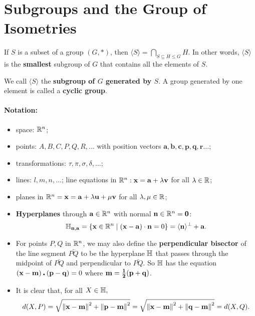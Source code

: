 \section{Subgroups and the Group of Isometries}

\begin{lemma}
    If \(S\) is a subset of a group \((G, *)\), then \(\langle S \rangle = \bigcap_{S \subseteq H \leq G} H\). In other words, \(\langle S \rangle\) is the \textbf{smallest} subgroup of \(G\) that contains all the elements of \(S\).
\end{lemma}

\begin{definition}
    We call \(\langle S \rangle\) the \textbf{subgroup of \(G\) generated by \(S\)}. A group generated by one element is called a \textbf{cyclic group}.
\end{definition}

\paragraph{Notation:}
\begin{itemize}
    \item space: \(\mathbb{R}^n\);
    \item points: \(A, B, C, P, Q, R, \dots\) with position vectors \(\mathbf{a, b, c, p , q, r} \dots\);
    \item transformations: \(\tau, \pi, \sigma, \delta, \dots\);
    \item lines: \(l, m, n, \dots\); line equations in \(\mathbb{R}^n: \mathbf{x} = \mathbf{a} + \lambda \mathbf{v}\) for all \(\lambda \in \mathbb{R}\);
    \item planes in \(\mathbb{R}^n = \mathbf{x} = \mathbf{a} + \lambda \mathbf{u} + \mu \mathbf{v}\) for all \(\lambda, \mu \in \mathbb{R}\);
    \item \textbf{Hyperplanes} through \(\mathbf{a} \in \mathbb{R}^n\) with normal \(\mathbf{n} \in \mathbb{R}^n = \mathbf{0}\):
          \[\mathbb{H}_{\mathbf{n, a}} = \{ \mathbf{x} \in \mathbb{R}^n \mid (\mathbf{x} - \mathbf{a}) \cdot \mathbf{n} = 0 \} = \langle \mathbf{n} \rangle^\perp + \mathbf{a}. \]
    \item For points \(P, Q\) in \(\mathbb{R}^n\), we may also define the \textbf{perpendicular bisector} of the line segment \(\bar{PQ}\) to be the hyperplane \(\mathbb{H}\) that passes through the midpoint of \(\bar{PQ}\) and perpendicular to \(\bar{PQ}\). So \(\mathbb{H}\) has the equation \(\mathbf{(x - m) \centerdot (p - q)} = 0\) where \(\mathbf{m = \frac{1}{2} (p + q)}\).
    \item It is clear that, for all \(X \in \mathbb{H},\)
          \[d(X, P) = \sqrt{\norm{\mathbf{x - m}}^2 + \norm{\mathbf{p - m}}^2} = \sqrt{\norm{\mathbf{x - m}}^2 + \norm{\mathbf{q - m}}^2} = d(X, Q).\]
\end{itemize}

